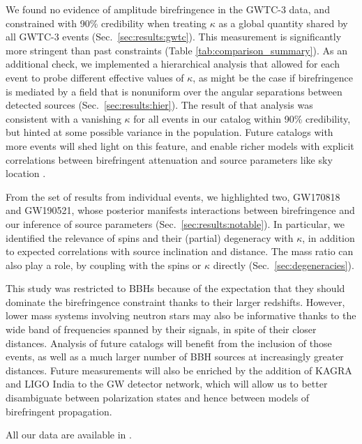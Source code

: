 \documentclass[aps,prd,twocolumn,superscriptaddress,preprintnumbers,nofootinbib]{revtex4-2}
\begin{document}
We found no evidence of amplitude birefringence in the GWTC-3 data, and constrained with 90\% credibility when treating $\kappa$ as a global quantity shared by all GWTC-3 events (Sec.~\ref{sec:results:gwtc}).
This measurement is significantly more stringent than past constraints (Table \ref{tab:comparison_summary}).
As an additional check, we implemented a hierarchical analysis that allowed for each event to probe different effective values of $\kappa$, as might be the case if birefringence is mediated by a field that is nonuniform over the angular separations between detected sources (Sec.~\ref{sec:results:hier}).
The result of that analysis was consistent with a vanishing $\kappa$ for all events in our catalog within 90\% credibility, but hinted at some possible variance in the population.
Future catalogs with more events will shed light on this feature, and enable richer models with explicit correlations between birefringent attenuation and source parameters like sky location \citep{Goyal:2023uvm,Ezquiaga:2021ler}.

From the set of results from individual events, we highlighted two, GW170818 and GW190521, whose posterior manifests interactions between birefringence and our inference of source parameters (Sec.~\ref{sec:results:notable}).
In particular, we identified the relevance of spins and their (partial) degeneracy with $\kappa$, in addition to expected correlations with source inclination and distance.
The mass ratio can also play a role, by coupling with the spins or $\kappa$ directly (Sec.~\ref{sec:degeneracies}).

This study was restricted to \acp{BBH} because of the expectation that they should dominate the birefringence constraint thanks to their larger redshifts.
However, lower mass systems involving neutron stars may also be informative thanks to the wide band of frequencies spanned by their signals, in spite of their closer distances.
Analysis of future catalogs will benefit from the inclusion of those events, as well as a much larger number of \ac{BBH} sources at increasingly greater distances.
Future measurements will also be enriched by the addition of KAGRA \cite{KAGRA} and LIGO India to the \ac{GW} detector network, which will allow us to better disambiguate between polarization states and hence between models of birefringent propagation.

All our data are available in \citet{dataset}.
\end{document}
